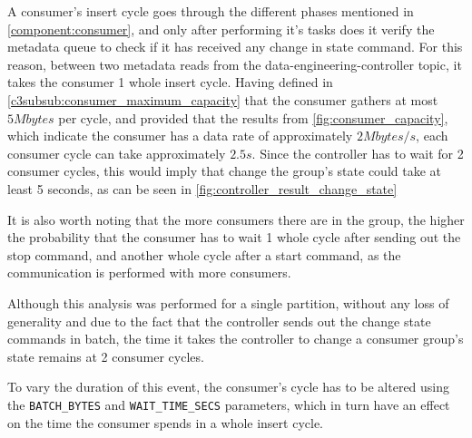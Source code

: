 A consumer's insert cycle goes through the different phases mentioned in \ref{component:consumer}, and only after performing it's tasks does it verify the metadata queue to check if it has received any change in state command. For this reason, between two metadata reads from the data-engineering-controller topic, it takes the consumer 1 whole insert cycle. Having defined in \ref{c3subsub:consumer_maximum_capacity} that the consumer gathers at most $5Mbytes$ per cycle, and provided that the results from \ref{fig:consumer_capacity}, which indicate the consumer has a data rate of approximately $2Mbytes/s$, each consumer cycle can take approximately $2.5s$. Since the controller has to wait for 2 consumer cycles, this would imply that change the group's state could take at least 5 seconds, as can be seen in \ref{fig:controller_result_change_state}

It is also worth noting that the more consumers there are in the group, the higher the probability that the consumer has to wait 1 whole cycle after sending out the stop command, and another whole cycle after a start command, as the communication is performed with more consumers.

Although this analysis was performed for a single partition, without any loss of generality and due to the fact that the controller sends out the change state commands in batch, the time it takes the controller to change a consumer group's state remains at 2 consumer cycles.

To vary the duration of this event, the consumer's cycle has to be altered using the \lstinline[language=Python]{BATCH_BYTES} and \lstinline[language=Python]{WAIT_TIME_SECS} parameters, which in turn have an effect on the time the consumer spends in a whole insert cycle.